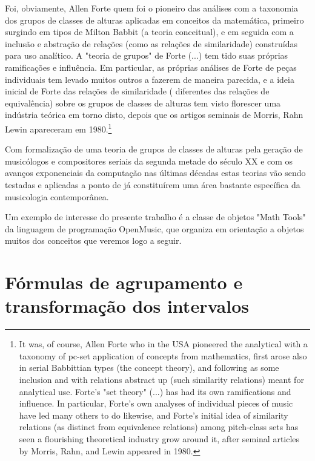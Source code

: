 \documentclass[
	12pt,				%
	openright,			%
	twoside,			%
	a4paper,			%
	english,			%
	french,				%
	spanish,			%
	brazil				%
	]{abntex2}
\begin{document}
\begin{citacao}
Foi, obviamente, Allen Forte quem foi o pioneiro das análises com a taxonomia dos grupos de classes de alturas aplicadas em conceitos da matemática, primeiro surgindo em tipos de Milton Babbit (a teoria conceitual), e em seguida com a inclusão e abstração de relações (como as relações de similaridade) construídas para uso analítico. A "teoria de grupos" de Forte (...) tem tido suas próprias ramificações e influência. Em particular, as próprias análises de Forte de peças individuais tem levado muitos outros a fazerem de maneira parecida, e a ideia inicial de Forte das relações de similaridade ( diferentes das relações de equivalência) sobre os grupos de classes de alturas tem visto florescer uma indústria teórica em torno disto, depois que os artigos seminais de Morris, Rahn  Lewin apareceram em 1980.\cite{rahn2004swerve}\footnote{
It was, of course, Allen Forte who in the USA pioneered the analytical with a taxonomy of pc-set application of concepts from mathematics, first arose also in serial Babbittian types (the concept theory), and following as some inclusion and with relations abstract up (such similarity relations) meant for analytical use. Forte's "set theory" (...) has had its own ramifications and influence. In particular, Forte's own analyses of individual pieces of music have led many others to do likewise, and Forte's initial idea of similarity relations (as distinct from equivalence relations) among pitch-class sets has seen a flourishing theoretical industry grow around it, after seminal articles by Morris, Rahn, and Lewin appeared in 1980.\cite{rahn2004swerve}}
\end{citacao}




Com formalização de uma teoria de grupos de classes de alturas pela geração de musicólogos e compositores seriais da segunda metade do século XX e com os avanços exponenciais da computação nas últimas décadas estas teorias vão sendo testadas e aplicadas a ponto de já constituírem uma área bastante específica da musicologia contemporânea.\cite{aroundset2013}

Um exemplo de interesse do presente trabalho é a classe de objetos "Math Tools"\cite{andreatta2003implementing,AndreataOMtutorial,DebrilOM} da linguagem de programação OpenMusic, que organiza em orientação a objetos muitos dos conceitos que veremos logo a seguir. 



\section{Fórmulas de agrupamento e transformação dos intervalos}
\end{document}
